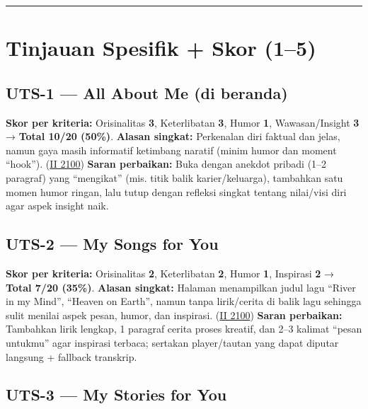 \documentclass[
  letterpaper,
  DIV=11,
  numbers=noendperiod]{scrreprt}
\begin{document}
\begin{center}\rule{0.5\linewidth}{0.5pt}\end{center}

\section{Tinjauan Spesifik + Skor
(1--5)}\label{tinjauan-spesifik-skor-15}

\subsection{UTS-1 --- All About Me (di
beranda)}\label{uts-1-all-about-me-di-beranda}

\textbf{Skor per kriteria:} Orisinalitas \textbf{3}, Keterlibatan
\textbf{3}, Humor \textbf{1}, Wawasan/Insight \textbf{3} → \textbf{Total
10/20 (50\%)}. \textbf{Alasan singkat:} Perkenalan diri faktual dan
jelas, namun gaya masih informatif ketimbang naratif (minim humor dan
moment ``hook''). (\href{https://ii-2100.github.io/all-about-me/}{II
2100}) \textbf{Saran perbaikan:} Buka dengan anekdot pribadi (1--2
paragraf) yang ``mengikat'' (mis. titik balik karier/keluarga),
tambahkan satu momen humor ringan, lalu tutup dengan refleksi singkat
tentang nilai/visi diri agar aspek insight naik.

\subsection{UTS-2 --- My Songs for You}\label{uts-2-my-songs-for-you-1}

\textbf{Skor per kriteria:} Orisinalitas \textbf{2}, Keterlibatan
\textbf{2}, Humor \textbf{1}, Inspirasi \textbf{2} → \textbf{Total 7/20
(35\%)}. \textbf{Alasan singkat:} Halaman menampilkan judul lagu ``River
in my Mind'', ``Heaven on Earth'', namun tanpa lirik/cerita di balik
lagu sehingga sulit menilai aspek pesan, humor, dan inspirasi.
(\href{https://ii-2100.github.io/all-about-me/My_Song_for_You/index.html}{II
2100}) \textbf{Saran perbaikan:} Tambahkan lirik lengkap, 1 paragraf
cerita proses kreatif, dan 2--3 kalimat ``pesan untukmu'' agar inspirasi
terbaca; sertakan player/tautan yang dapat diputar langsung + fallback
transkrip.

\subsection{UTS-3 --- My Stories for
You}\label{uts-3-my-stories-for-you-1}
\end{document}
